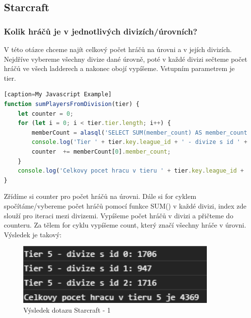 \documentclass[a4, titlepage]{article}
\begin{document}
\subsection{Starcraft}
\subsubsection{Kolik hráčů je v jednotlivých divizích/úrovních?}
V této otázce chceme najít celkový počet hráčů na úrovni a v jejích divizích. Nejdříve vybereme všechny divize dané úrovně, poté v každé divizi sečteme počet hráčů ve všech ladderech a nakonec obojí vypíšeme. Vstupním parametrem je tier.
\begin{lstlisting}[language=JavaScript][caption=My Javascript Example]
function sumPlayersFromDivision(tier) {
    let counter = 0;
    for (let i = 0; i < tier.tier.length; i++) {
        memberCount = alasql('SELECT SUM(member_count) AS member_count FROM ?', [tier.tier[i].division]);
        console.log('Tier ' + tier.key.league_id + ' - divize s id ' + tier.tier[i].id + ': ' + memberCount[0].member_count);
        counter  += memberCount[0].member_count;
    }
    console.log('Celkovy pocet hracu v tieru ' + tier.key.league_id + ' je ' + counter);
}
\end{lstlisting}
Zřídíme si counter pro počet hráčů na úrovni. Dále si for cyklem spočítáme/vybereme počet hráčů pomocí funkce SUM() v každé divizi, index zde slouží pro iteraci mezi divizemi. Vypíšeme počet hráčů v divizi a přičteme do counteru. Za tělem for cyklu vypíšeme count, který značí všechny hráče v úrovni. Výsledek je takový: 
\begin{figure}[h]
    \centering
    \includegraphics[width=10cm]{S1}
    \caption{Výsledek dotazu Starcraft - 1}
\end{figure}
\newpage
\end{document}

